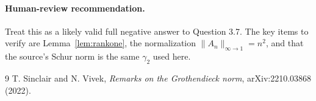\documentclass[11pt]{article}
\newcommand{\gamtwo}{\gamma_2}
\begin{document}
\paragraph{Human-review recommendation.}
Treat this as a likely valid full negative answer to Question 3.7.  The key
items to verify are Lemma~\ref{lem:rankone}, the normalization
$\|A_n\|_{\infty\to1}=n^2$, and that the source's Schur norm is the same
$\gamtwo$ used here.

\begin{thebibliography}{9}
T. Sinclair and N. Vivek,
\emph{Remarks on the Grothendieck norm},
arXiv:2210.03868 (2022).
\end{thebibliography}
\end{document}
